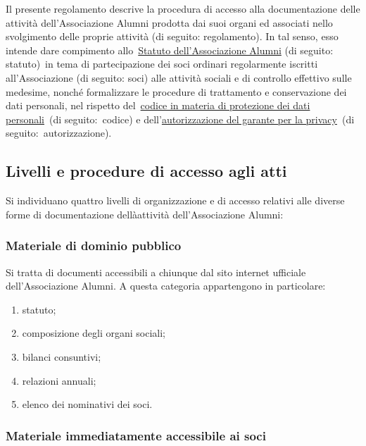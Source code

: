 Il presente regolamento descrive la procedura di accesso alla
documentazione delle attività dell’Associazione Alumni prodotta dai suoi
organi ed associati nello svolgimento delle proprie attività (di seguito:
regolamento). In tal senso, esso intende dare compimento
allo \href{http://www.alumniscuolagalileiana.it/wp-content/uploads/2017/03/Statuto-Alumni-SGSS.pdf}{Statuto
dell’Associazione Alumni} (di seguito: statuto) in tema di partecipazione
dei soci ordinari regolarmente iscritti all’Associazione (di seguito: soci)
alle attività sociali e di controllo effettivo sulle medesime, nonché
formalizzare le procedure di trattamento e conservazione dei dati
personali, nel rispetto del \href{http://www.garanteprivacy.it/web/guest/home/docweb/-/docweb-display/docweb/1311248}{codice in materia di protezione dei dati
personali}~(di seguito: codice) e dell’\href{http://garanteprivacy.it/web/guest/home/docweb/-/docweb-display/docweb/5803310}{autorizzazione del garante per la
privacy}~(di seguito: autorizzazione). 

\subsection{Livelli e procedure di accesso agli atti}

Si individuano quattro livelli di organizzazione e di accesso relativi alle
diverse forme di documentazione dellàattività dell’Associazione Alumni:

\subsubsection{Materiale di dominio pubblico}\label{materiale-di-dominio-pubblico}

Si tratta di documenti accessibili a chiunque dal sito internet ufficiale
dell’Associazione Alumni. A questa categoria appartengono in particolare: 
\begin{enumerate}
\item statuto;
\item composizione degli organi sociali;
\item bilanci consuntivi;
\item relazioni annuali;
\item elenco dei nominativi dei soci.
\end{enumerate}

\subsubsection{Materiale immediatamente accessibile ai soci}\label{materiale-comunicato-ai-soci}


